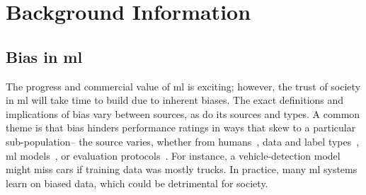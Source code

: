 \section{Background Information}
    \subsection{Bias in \gls{ml}}
        The progress and commercial value of \gls{ml} is exciting; however, the trust of society in \gls{ml} will take time to build due to inherent biases. The exact definitions and implications of bias vary between sources, as do its sources and types. A common theme is that bias hinders performance ratings in ways that skew to a particular sub-population-- the source varies, whether from humans~\cite{windmann1998subconscious}, data and label types~\cite{tommasi2017deeper}, \gls{ml} models~\cite{amini2019uncovering, kim2019learning}, or evaluation protocols~\cite{stock2018convnets}. For instance, a vehicle-detection model might miss cars if training data was mostly trucks. In practice, many \gls{ml} systems learn on biased data, which could be detrimental for society. 


